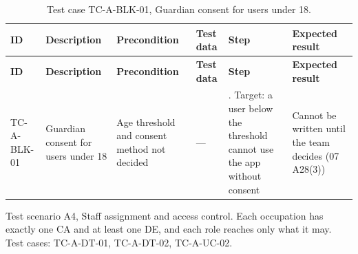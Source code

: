 {\footnotesize{}\renewcommand{\arraystretch}{1.1}
\begin{longtable}{|>{\raggedright\arraybackslash}p{}|>{\raggedright\arraybackslash}p{}|>{\raggedright\arraybackslash}p{}|>{\raggedright\arraybackslash}p{}|>{\raggedright\arraybackslash}p{}|>{\raggedright\arraybackslash}p{}|}
\caption{Test case TC-\allowbreak{}A-\allowbreak{}BLK-\allowbreak{}01, Guardian consent for users under 18.} \\
\hline
\textbf{ID} & \textbf{Description} & \textbf{Precondition} & \textbf{Test data} & \textbf{Step} & \textbf{Expected result} \\ \hline
\endfirsthead
\hline
\textbf{ID} & \textbf{Description} & \textbf{Precondition} & \textbf{Test data} & \textbf{Step} & \textbf{Expected result} \\ \hline
\endhead
TC-A-BLK-01 & Guardian consent for users under 18 & Age threshold and consent method not decided & --- & 1. Target: a user below the threshold cannot use the app without consent & Cannot be written until the team decides (07 A28(3)) \\ \hline
\end{longtable}
}

Test scenario A4, Staff assignment and access control. Each occupation has exactly one CA and at least one DE, and each role reaches only what it may. Test cases: TC-A-DT-01, TC-A-DT-02, TC-A-UC-02.

